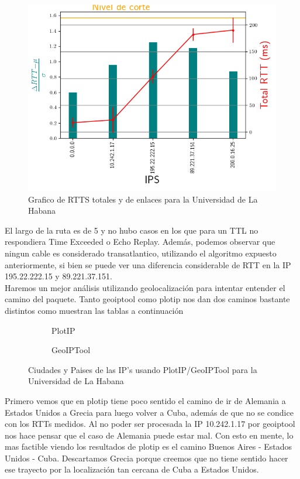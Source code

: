 \begin{figure}[ht]
	\begin{center}
		\includegraphics[width=0.8\columnwidth]{imagenes/rtts_habana.png}
		\caption{Grafico de RTTS totales y de enlaces para la Universidad de La Habana}
	\end{center}
\end{figure}

El largo de la ruta es de 5 y no hubo casos en los que para un TTL no respondiera
Time Exceeded o Echo Replay. Adem\'as, podemos observar que ningun cable es considerado
transatlantico, utilizando el algoritmo expuesto anteriormente, si bien se
puede ver una diferencia considerable de RTT en la IP 195.22.222.15 y
89.221.37.151.  \\

Haremos un mejor an\'alisis utilizando geolocalizaci\'on para intentar entender
el camino del paquete. Tanto geoiptool como plotip nos dan dos caminos bastante
distintos como muestran las tablas a continuaci\'on
 
\begin{figure}[ht]
	\begin{subfigure}[b]{0.5\textwidth}
		\centering
		
		\caption{PlotIP}
	\end{subfigure}
	\begin{subfigure}[b]{0.5\textwidth}
		\centering
		
		\caption{GeoIPTool}
	\end{subfigure}
	\caption{Ciudades y Paises de las IP's usando PlotIP/GeoIPTool para la Universidad de La Habana}
\end{figure}


Primero vemos que en plotip tiene poco sentido el camino de ir de Alemania a
Estados Unidos a Grecia para luego volver a Cuba, adem\'as de que no se condice
con los RTTs medidos. Al no poder ser procesada la IP 10.242.1.17 por geoiptool
nos hace pensar que el caso de Alemania puede estar mal. Con esto en mente, lo
mas factible viendo los resultados de plotip es el camino Buenos Aires -
Estados Unidos - Cuba. Descartamos Grecia porque creemos que no tiene sentido
hacer ese trayecto por la localizaci\'on tan cercana de Cuba a Estados
Unidos.\\

